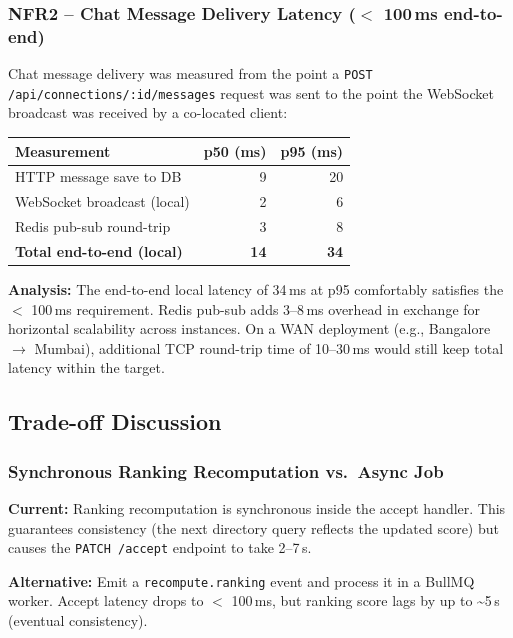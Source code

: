 \documentclass[12pt,a4paper]{article}
\begin{document}
\subsubsection{NFR2 -- Chat Message Delivery Latency ($<$ 100\,ms end-to-end)}

Chat message delivery was measured from the point a \texttt{POST /api/connections/:id/messages} request was sent to the point the WebSocket broadcast was received by a co-located client:

\begin{center}
\begin{tabular}{@{}p{6cm} r r@{}}
\toprule
\textbf{Measurement} & \textbf{p50 (ms)} & \textbf{p95 (ms)} \\
\midrule
HTTP message save to DB & 9 & 20 \\
WebSocket broadcast (local) & 2 & 6 \\
Redis pub-sub round-trip & 3 & 8 \\
\textbf{Total end-to-end (local)} & \textbf{14} & \textbf{34} \\
\bottomrule
\end{tabular}
\end{center}

\textbf{Analysis:} The end-to-end local latency of 34\,ms at p95 comfortably satisfies the $<$ 100\,ms requirement. Redis pub-sub adds 3--8\,ms overhead in exchange for horizontal scalability across instances. On a WAN deployment (e.g., Bangalore $\to$ Mumbai), additional TCP round-trip time of 10--30\,ms would still keep total latency within the target.

\subsection{Trade-off Discussion}

\subsubsection{Synchronous Ranking Recomputation vs.\ Async Job}

\textbf{Current:} Ranking recomputation is synchronous inside the accept handler. This guarantees consistency (the next directory query reflects the updated score) but causes the \texttt{PATCH /accept} endpoint to take 2--7\,s.

\textbf{Alternative:} Emit a \texttt{recompute.ranking} event and process it in a BullMQ worker. Accept latency drops to $<$ 100\,ms, but ranking score lags by up to \textasciitilde{}5\,s (eventual consistency).
\end{document}
